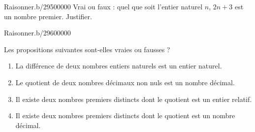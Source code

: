 \begin{pageAD}
\begin{ExoCad}{Raisonner.}{b/295}{0}{0}{0}{0}{0}
Vrai ou faux : quel que soit l'entier naturel $n$, $2n+3$ est un nombre premier. Justifier.
\end{ExoCad}


 
\begin{ExoCad}{Raisonner.}{b/296}{0}{0}{0}{0}{0}

Les propositions suivantes sont-elles vraies ou fausses ?
\begin{enumerate}[leftmargin=*]
\item La différence de deux nombres entiers naturels est un entier naturel. 
\item Le quotient de deux nombres décimaux non nuls est un nombre décimal.  
\item Il existe deux nombres premiers distincts dont le quotient est un
  entier relatif. 
\item Il existe deux nombres premiers distincts dont le quotient est un
  nombre décimal. 
\end{enumerate} 
 
 \end{ExoCad}
 
\end{pageAD}


